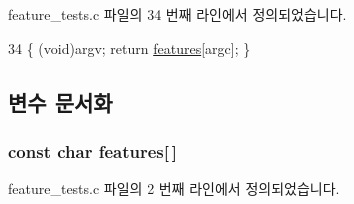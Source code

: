 feature\+\_\+tests.\+c 파일의 34 번째 라인에서 정의되었습니다.


\begin{DoxyCode}
34 \{ (void)argv; \textcolor{keywordflow}{return} \hyperlink{avdecc-lib_2_c_make_files_2feature__tests_8c_a1582568e32f689337602a16bf8a5bff0}{features}[argc]; \}
\end{DoxyCode}


\subsection{변수 문서화}
\subsubsection[{\texorpdfstring{features}{features}}]{\setlength{\rightskip}{0pt plus 5cm}const char features\mbox{[}$\,$\mbox{]}}\hypertarget{avdecc-lib_2jdksavdecc-c_2_c_make_files_2feature__tests_8c_a1582568e32f689337602a16bf8a5bff0}{}\label{avdecc-lib_2jdksavdecc-c_2_c_make_files_2feature__tests_8c_a1582568e32f689337602a16bf8a5bff0}


feature\+\_\+tests.\+c 파일의 2 번째 라인에서 정의되었습니다.

